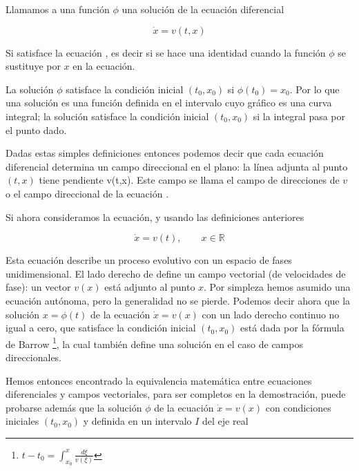 \documentclass[a4paper,10pt]{article}
\numberwithin{equation}{section}
\begin{document}
Llamamos a una función $\phi$ una solución de la ecuación diferencial

\begin{equation}
 \dot{x} = v(t,x)
 \label{eq:pro5e2}
\end{equation}

Si satisface la ecuación , es decir si se hace una identidad cuando
la función $\phi$ se sustituye por $x$ en la ecuación.

La solución $\phi$ satisface la condición inicial $(t_0, x_0)$ si $\phi(t_0)= x_0$. Por
lo que una solución es una función definida en el intervalo cuyo gráfico es una curva integral;
la solución satisface la condición inicial $(t_0, x_0)$  si la integral pasa por el
punto dado.

Dadas estas simples definiciones entonces podemos decir que cada ecuación diferencial 
 determina un campo direccional en el plano: la línea adjunta al punto
$(t,x)$ tiene pendiente v(t,x). Este campo se llama el campo de direcciones de $v$ o 
el campo direccional de la ecuación . 

Si ahora consideramos la ecuación, y usando las definiciones anteriores

\begin{equation}
 \dot{x} = v(t), \qquad x \in \mathbb{R}
 \label{eq:pro5e3}
\end{equation}

Esta ecuación describe un proceso evolutivo con un espacio de fases 
unidimensional. El lado derecho de  define un campo
vectorial (de velocidades de fase): un vector $v(x)$ está adjunto al punto
$x$. Por simpleza hemos asumido una ecuación autónoma, pero la generalidad
no se pierde. Podemos decir ahora que la solución $x=\phi(t)$ de la ecuación
$\dot{x} = v(x)$ con un lado derecho continuo no igual a cero, que satisface 
la condición inicial $(t_0,x_0)$ está dada por la fórmula de Barrow
\footnote{$t-t_0 = \int_{x_0}^x \frac{d\xi}{v(\xi)}$}, la cual también define 
una solución en el caso de campos direccionales.

\vspace{.3cm}

Hemos entonces encontrado la equivalencia matemática entre ecuaciones diferenciales
y campos vectoriales, para ser completos en la demostración, puede probarse además
que la solución $\phi$ de la ecuación $\dot{x} = v(x)$ con condiciones iniciales
$(t_0,x_0)$ y definida en un intervalo $I$ del eje real
\end{document}
